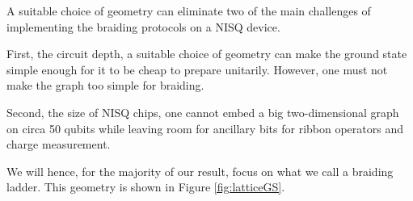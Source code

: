 \documentclass[two column]{article}
\newcommand{\caro}[1]{\textcolor{red}{[#1]}}
\begin{document}
A suitable choice of geometry can eliminate two of the main challenges of implementing the braiding protocols on a NISQ device.


First, the circuit depth, a suitable choice of geometry can make the ground state simple enough for it to be cheap to prepare unitarily. However, one must not make the graph too simple for braiding.

Second, the size of NISQ chips, one cannot embed a big two-dimensional graph on circa 50 qubits while leaving room for ancillary bits for ribbon operators and charge measurement.

We will hence, for the majority of our result, focus on what we call a braiding ladder. 
This geometry is shown in Figure \ref{fig:latticeGS}.
\end{document}
